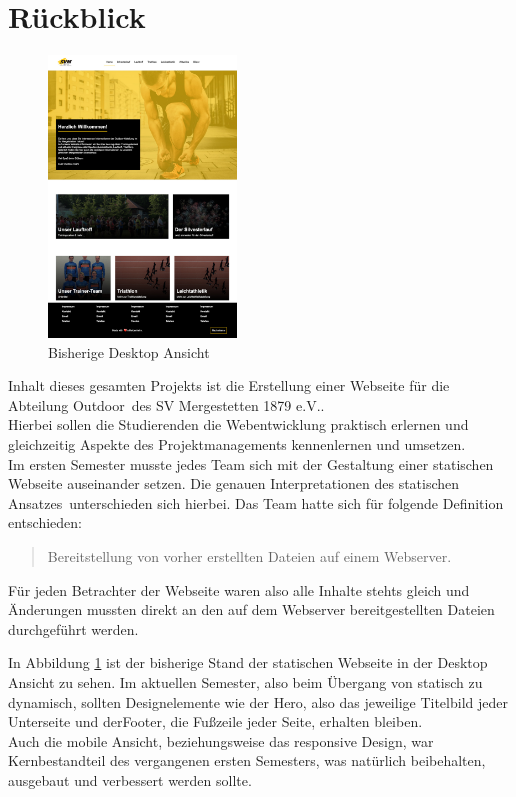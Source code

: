 \documentclass[12pt,a4paper]{article}
\begin{document}
\section{Rückblick}
\begin{figure}
  \includegraphics[width=5cm]{Home_Outdoor.jpg}
  \caption{Bisherige Desktop Ansicht}
  \label{img:Home_Outdoor_alt}
\end{figure}
Inhalt dieses gesamten Projekts ist die Erstellung einer Webseite für die Abteilung \glqq Outdoor\grqq \ des SV Mergestetten 1879 e.V.. \\
Hierbei sollen die Studierenden die Webentwicklung praktisch erlernen und gleichzeitig Aspekte des Projektmanagements kennenlernen und umsetzen.\\
Im ersten Semester musste jedes Team sich mit der Gestaltung einer statischen Webseite auseinander setzen. Die genauen Interpretationen des \glqq statischen Ansatzes\grqq \ unterschieden sich hierbei. Das Team hatte sich für folgende Definition entschieden: 
\begin{quote}
Bereitstellung von vorher erstellten Dateien auf einem Webserver.
\end{quote}
Für jeden Betrachter der Webseite waren also alle Inhalte stehts gleich und Änderungen mussten direkt an den auf dem Webserver bereitgestellten Dateien durchgeführt werden.\\\par\smallskip
In Abbildung \ref{img:Home_Outdoor_alt} ist der bisherige Stand der statischen Webseite in der Desktop Ansicht zu sehen. Im aktuellen Semester, also beim Übergang von statisch zu dynamisch, sollten Designelemente wie der \glqq Hero\grqq, also das jeweilige Titelbild jeder Unterseite und der\glqq Footer\grqq, die Fußzeile jeder Seite, erhalten bleiben.\\
Auch die mobile Ansicht, beziehungsweise das responsive Design, war Kernbestandteil des vergangenen ersten Semesters, was natürlich beibehalten, ausgebaut und verbessert werden sollte.
\end{document}
